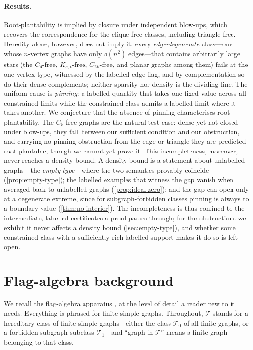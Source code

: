 \documentclass[11pt]{article}
\theoremstyle{definition}
\newcommand{\T}{\mathcal{T}}
\begin{document}
\paragraph{Results.}
Root-plantability is implied by closure under independent blow-ups, which recovers the
correspondence for the clique-free classes, including triangle-free.  Heredity alone, however,
does not imply it: every \emph{edge-degenerate} class---one whose $n$-vertex graphs have
only $o(n^2)$ edges---that contains arbitrarily large stars (the $C_4$-free,
$K_{s,t}$-free, $C_{2k}$-free, and planar graphs among them) fails at the one-vertex
type, witnessed by the labelled edge flag, and by complementation so do their dense
complements; neither sparsity nor density is the dividing line.  The uniform cause is
\emph{pinning}: a labelled quantity that takes one fixed value across all constrained
limits while the constrained class admits a labelled limit where it takes another.  We conjecture
that the absence of pinning characterises root-plantability.  The $C_5$-free graphs are
the natural test case: dense yet not closed under blow-ups, they fall between our
sufficient condition and our obstruction, and carrying no pinning obstruction from the
edge or triangle they are predicted root-plantable, though we cannot yet prove it.  This incompleteness, moreover, never
reaches a density bound.  A density bound is a statement about unlabelled graphs---the
\emph{empty type}---where the two semantics provably coincide (\cref{prop:empty-type});
the labelled examples that witness the gap vanish when averaged back to unlabelled graphs
(\cref{prop:ideal-zero}); and the gap can open only at a degenerate extreme, since for
subgraph-forbidden classes pinning is always to a boundary value (\cref{thm:no-interior}).  The incompleteness is
thus confined to the intermediate, labelled certificates a proof passes through; for the
obstructions we exhibit it never affects a density bound (\cref{sec:empty-type}), and
whether some constrained class with a sufficiently rich labelled support makes it do so is
left open.

\section{Flag-algebra background}\label{sec:background}

We recall the flag-algebra apparatus \cite{Razborov2007}, at the level of detail a reader
new to it needs.  Everything is phrased for finite simple graphs.  Throughout, $\T$ stands
for a hereditary class of finite simple graphs---either the class $\T_0$ of all finite
graphs, or a forbidden-subgraph subclass $\T_1$---and ``graph in $\T$'' means a finite
graph belonging to that class.
\end{document}
